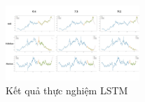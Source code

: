 \begin{figure}[H]
\centerline{\includegraphics[width=0.45\textwidth]{img/lstm_run.jpg}}
\caption{Kết quả thực nghiệm LSTM}
\label{fig}
\end{figure}